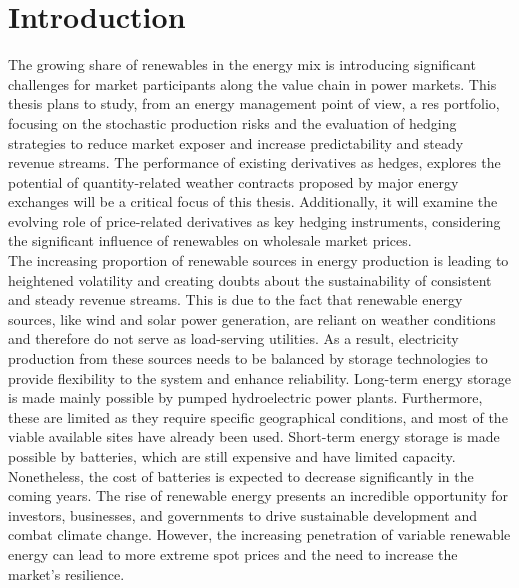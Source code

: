 
%

\chapter{Introduction}
\label{ch:introduction}

\glsresetall


  The growing share of renewables in the energy mix is introducing significant challenges for market participants
  along the value chain in power markets\cite{hain_managing_2018}.
  This thesis plans to study, from an energy management point of view, a \gls{res} portfolio,
  focusing on the stochastic production risks and the evaluation of hedging strategies
  to reduce market exposer and increase predictability and steady revenue streams.
  The performance of existing derivatives as hedges, explores the potential of quantity-related weather contracts
  proposed by major energy exchanges will be a critical focus of this thesis.
  Additionally, it will examine the evolving role of price-related derivatives as key hedging instruments,
  considering the significant influence of renewables on wholesale market prices.\\

  The increasing proportion of renewable sources in energy production is leading to heightened volatility
  and creating doubts about the sustainability of consistent and steady revenue streams.
  This is due to the fact that renewable energy sources, like wind and solar power generation,
  are reliant on weather conditions and therefore do not serve as load-serving utilities.
  As a result, electricity production from these sources needs
  to be balanced by storage technologies to provide flexibility to the system and enhance reliability.
  Long-term energy storage is made mainly possible by pumped hydroelectric power plants.
  Furthermore, these are limited as they require specific geographical conditions,
  and most of the viable available sites have already been used.
  Short-term energy storage is made possible by batteries, which are still expensive and have limited capacity.
  Nonetheless, the cost of batteries is expected to decrease significantly in the coming
  years\cite{viswanathan_2022_2022, cole_cost_2023}.
  The rise of renewable energy presents an incredible opportunity for investors,
  businesses, and governments to drive sustainable development and combat climate change.
  However, the increasing penetration of variable renewable energy can lead to more extreme spot prices and the need
  to increase the market's resilience. \\

